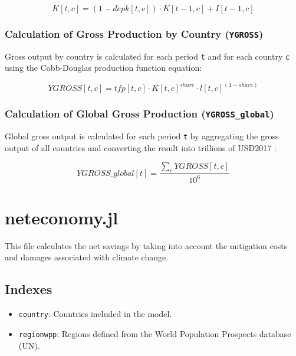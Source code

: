 \documentclass[
]{article}
\providecommand{\tightlist}{%
  \setlength{\itemsep}{0pt}\setlength{\parskip}{0pt}}
\begin{document}
\begin{equation}
 K[t,c] = (1 - depk[t,c]) \cdot K[t-1,c] + I[t-1,c] 
\end{equation}


\subsubsection{\texorpdfstring{Calculation of Gross Production by Country
(\texttt{YGROSS})}{Calculation of Gross Production by Country (YGROSS)}}\label{calculation-of-gross-production-by-country-ygross}

Gross output by country is calculated for each period \texttt{t} and for
each country \texttt{c} using the Cobb-Douglas production function
equation:

\begin{equation}
 YGROSS[t,c] = tfp[t,c] \cdot K[t,c]^{share} \cdot l[t,c]^{(1-share)} 
\end{equation}


\subsubsection{\texorpdfstring{Calculation of Global Gross Production
(\texttt{YGROSS\_global})}{Calculation of Global Gross Production (YGROSS\_global)}}\label{calculation-of-global-gross-production-ygross_global}

Global gross output is calculated for each period \texttt{t} by
aggregating the gross output of all countries and converting the result
into trillions of USD2017 :

\begin{equation}
 YGROSS\_global[t] = \frac{\sum_{c} YGROSS[t,c]}{10^6}
\end{equation}


\section{neteconomy.jl}\label{neteconomy.jl}

This file calculates the net savings by taking into account the
mitigation costs and damages associated with climate change.

\subsection{Indexes}\label{indexes-3}

\begin{itemize}
\tightlist
\item
  \texttt{country}: Countries included in the model.
\item
  \texttt{regionwpp}: Regions defined from the World Population Prospects database (UN).
\end{itemize}
\end{document}
